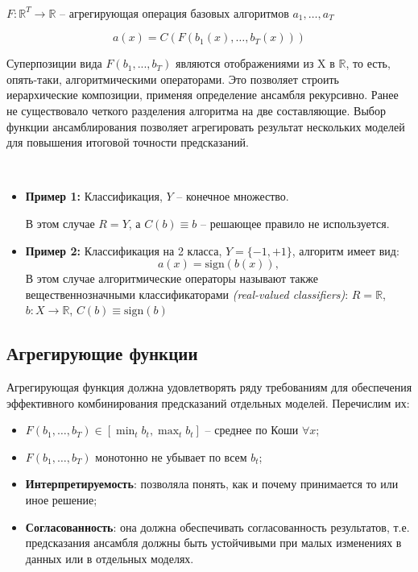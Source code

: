 \ \
    
    $F: \mathbb{R}^T \to \mathbb{R}$ – агрегирующая операция базовых алгоритмов $a_1, \dots, a_T$

    $$a(x) = C(F(b_1(x), \dots, b_T(x)))$$

    
Суперпозиции вида $F(b_1, ... , b_T )$ являются отображениями из X в $\mathbb{R}$, то есть, опять-таки, алгоритмическими операторами. Это позволяет строить иерархические композиции, применяя определение ансамбля рекурсивно.
Ранее не существовало четкого разделения алгоритма на две составляющие. Выбор функции ансамблирования позволяет  агрегировать результат нескольких моделей для повышения итоговой точности предсказаний.

\ \
\begin{itemize}
    \item \textbf{Пример 1:} Классификация, $Y$ – конечное множество.
    
    В этом случае $R = Y$, а $C(b) \equiv b$ – решающее правило не используется.
    \item \textbf{Пример 2:} Классификация на 2 класса, $Y = \{-1, +1\}$, алгоритм имеет вид:
    $$a(x) = \text{sign}(b(x)),$$
    В этом случае алгоритмические операторы называют также вещественнозначными классификаторами \textit{(real-valued classifiers)}: $R = \mathbb{R}$, $b: X \to \mathbb{R}$, $C(b) \equiv \text{sign}(b)$
\end{itemize}

\subsection{Агрегирующие функции}
Агрегирующая функция должна удовлетворять ряду требованиям для обеспечения эффективного комбинирования предсказаний отдельных моделей. Перечислим их:
\begin{itemize}
    \item $F(b_1, \dots, b_T) \in [\min_t b_t, \max_t b_t]$ – среднее по Коши $\forall x$;
    \item $F(b_1, \dots, b_T)$ монотонно не убывает по всем $b_t$;
    \item \textbf{Интерпретируемость}: позволяла понять, как и почему принимается то или иное решение;
    \item  \textbf{Согласованность}: она должна обеспечивать согласованность результатов, т.е. предсказания ансамбля должны быть устойчивыми при малых изменениях в данных или в отдельных моделях.
\end{itemize}

